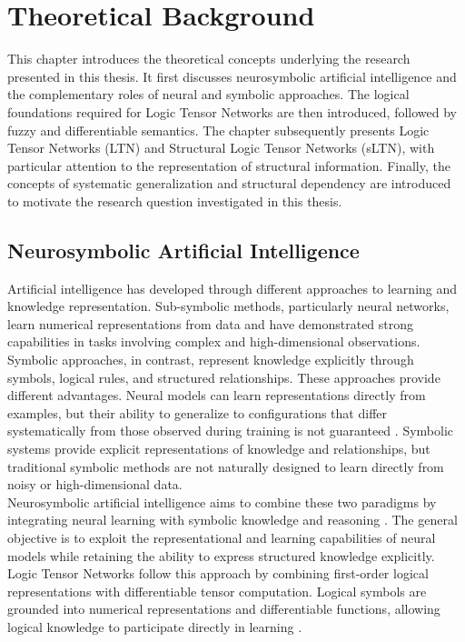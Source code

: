 \chapter{Theoretical Background}
\label{chap:background}

\noindent
This chapter introduces the theoretical concepts underlying the research presented in this thesis. It first discusses neurosymbolic artificial intelligence and the complementary roles of neural and symbolic approaches. The logical foundations required for Logic Tensor Networks are then introduced, followed by fuzzy and differentiable semantics. The chapter subsequently presents Logic Tensor Networks (LTN) and Structural Logic Tensor Networks (sLTN), with particular attention to the representation of structural information. Finally, the concepts of systematic generalization and structural dependency are introduced to motivate the research question investigated in this thesis.

\section{Neurosymbolic Artificial Intelligence}

\noindent
Artificial intelligence has developed through different approaches to learning and knowledge representation. Sub-symbolic methods, particularly neural networks, learn numerical representations from data and have demonstrated strong capabilities in tasks involving complex and high-dimensional observations. Symbolic approaches, in contrast, represent knowledge explicitly through symbols, logical rules, and structured relationships.
These approaches provide different advantages. Neural models can learn representations directly from examples, but their ability to generalize to configurations that differ systematically from those observed during training is not guaranteed \cite{lake2018generalization}. Symbolic systems provide explicit representations of knowledge and relationships, but traditional symbolic methods are not naturally designed to learn directly from noisy or high-dimensional data.
\\
Neurosymbolic artificial intelligence aims to combine these two paradigms by integrating neural learning with symbolic knowledge and reasoning \cite{garcez2023neurosymbolic}. The general objective is to exploit the representational and learning capabilities of neural models while retaining the ability to express structured knowledge explicitly.
Logic Tensor Networks follow this approach by combining first-order logical representations with differentiable tensor computation. Logical symbols are grounded into numerical representations and differentiable functions, allowing logical knowledge to participate directly in learning \cite{badreddine2022logic}.

